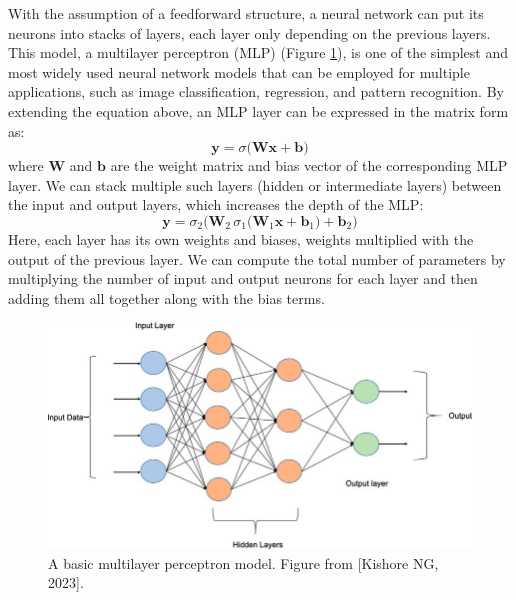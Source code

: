 With the assumption of a feedforward structure, a neural network can put its neurons into stacks of layers, each layer only depending on the previous layers. This model, a multilayer perceptron (\gls{MLP}) (Figure \ref{fig:mlp}), is one of the simplest and most widely used neural network models that can be employed for multiple applications, such as image classification, regression, and pattern recognition. By extending the equation above, an \gls{MLP} layer can be expressed in the matrix form as:
\begin{equation}
\mathbf{y} = \sigma \biggl(\mathbf{W}\mathbf{x} + \mathbf{b} \biggr)
\end{equation}
where $\mathbf{W}$ and $\mathbf{b}$ are the weight matrix and bias vector of the corresponding \gls{MLP} layer. We can stack multiple such layers (hidden or intermediate layers) between the input and output layers, which increases the depth of the MLP:
\begin{equation}
\mathbf{y} = \sigma_2 \biggl( \mathbf{W}_2 \,\sigma_1 \biggl(\mathbf{W}_1\mathbf{x} + \mathbf{b}_1 \biggr) + \mathbf{b}_2\biggr) 
\end{equation}
Here, each layer has its own weights and biases, weights multiplied with the output of the previous layer. We can compute the total number of parameters by multiplying the number of input and output neurons for each layer and then adding them all together along with the bias terms. 



\begin{figure}[ht]
  \centering
   \includegraphics[width=\linewidth]{Images/MLP.jpeg}
   \caption{A basic multilayer perceptron model. Figure from [Kishore NG, 2023].}
   \label{fig:mlp}
\end{figure}

